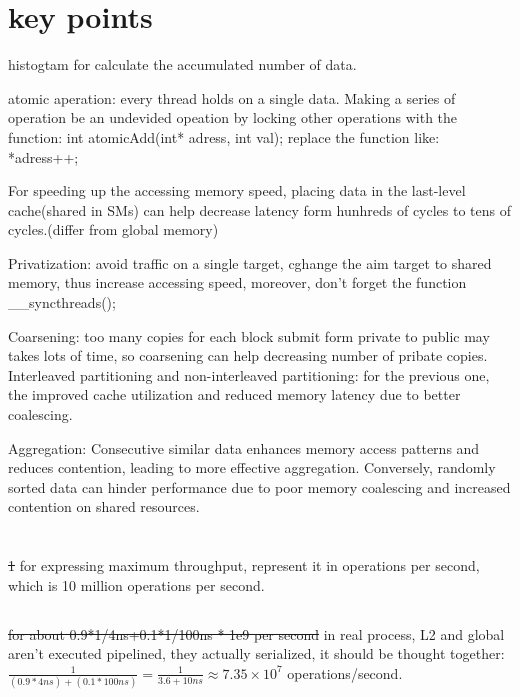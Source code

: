 \documentclass{article}
\begin{document}
\section*{key points}
histogtam for calculate the accumulated number of data.

atomic aperation: every thread holds on a single data. Making a series of operation be an undevided opeation by locking other operations with the function: int atomicAdd(int* adress, int val); replace the function like: *adress++;

For speeding up the accessing memory speed, placing data in the last-level cache(shared in SMs) can help decrease latency form hunhreds of cycles to tens of cycles.(differ from global memory)

Privatization: avoid traffic on a single target, cghange the aim target to shared memory, thus increase accessing speed, moreover, don't forget the function \_\_syncthreads();

Coarsening: too many copies for each block submit form private to public may takes lots of time, so coarsening can help decreasing number of pribate copies. Interleaved partitioning and non-interleaved partitioning: for the previous one, the improved cache utilization and reduced memory latency due to better coalescing.

Aggregation: Consecutive similar data enhances memory access patterns and reduces contention, leading to more effective aggregation. Conversely, randomly sorted data can hinder performance due to poor memory coalescing and increased contention on shared resources.


\section{}
\subsection{}
\sout{1} for expressing maximum throughput, represent it in operations per second, which is 10 million operations per second.

\subsection{}
\sout{for about 0.9*1/4ns+0.1*1/100ns * 1e9 per second}
in real process, L2 and global aren't executed pipelined, they actually serialized, it should be thought together: \(\frac{1}{(0.9*4ns)+(0.1*100ns)}=\frac{1}{3.6+10ns}\approx 7.35\times10^7\) operations/second.
\end{document}
